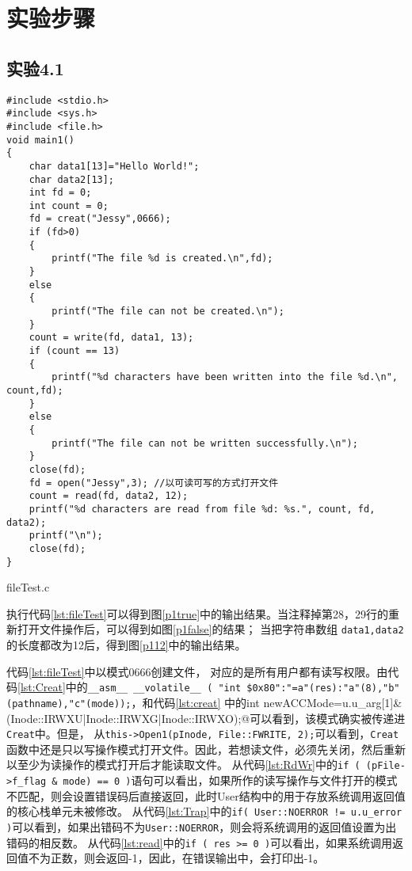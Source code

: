 \section{实验步骤}
\subsection{实验4.1}
\begin{listing}[htbp]
    \begin{verbatim}
#include <stdio.h>
#include <sys.h>
#include <file.h>
void main1()
{
    char data1[13]="Hello World!";
    char data2[13];
    int fd = 0;
    int count = 0;
    fd = creat("Jessy",0666);
    if (fd>0)
    {
        printf("The file %d is created.\n",fd);
    }
    else
    {
        printf("The file can not be created.\n");
    }
    count = write(fd, data1, 13);
    if (count == 13)
    {
        printf("%d characters have been written into the file %d.\n", count,fd);
    }
    else
    {
        printf("The file can not be written successfully.\n");
    }
    close(fd);
    fd = open("Jessy",3); //以可读可写的方式打开文件
    count = read(fd, data2, 12);
    printf("%d characters are read from file %d: %s.", count, fd, data2);
    printf("\n");
    close(fd);
}
    \end{verbatim}
    \caption{fileTest.c}\label{lst:fileTest}
\end{listing}

执行代码\ref{lst:fileTest}可以得到图\ref{p1true}中的输出结果。当注释掉第28，29行的重新打开文件操作后，可以得到如图\ref{p1false}的结果；
当把字符串数组 \texttt{data1,data2}的长度都改为12后，得到图\ref{p112}中的输出结果。

代码\ref{lst:fileTest}中以模式0666创建文件，
对应的是所有用户都有读写权限。由代码\ref{lst:Creat}中的\verb|__asm__ __volatile__ ( "int $0x80":"=a"(res):"a"(8),"b"(pathname),"c"(mode));|，和代码\ref{lst:creat}
中的\verb@unsigned int newACCMode=u.u_arg[1]&(Inode::IRWXU|Inode::IRWXG|Inode::IRWXO);@\newline 可以看到，该模式确实被传递进\texttt{Creat}中。但是，
从\verb|this->Open1(pInode, File::FWRITE, 2);|可以看到，\texttt{Creat}函数中还是只以写操作模式打开文件。因此，若想读文件，必须先关闭，然后重新以至少为读操作的模式打开后才能读取文件。
从代码\ref{lst:RdWr}中的\verb|if ( (pFile->f_flag & mode) == 0 )|语句可以看出，如果所作的读写操作与文件打开的模式不匹配，则会设置错误码后直接返回，此时User结构中的用于存放系统调用返回值的核心栈单元未被修改。
从代码\ref{lst:Trap}中的\verb|if( User::NOERROR != u.u_error )|可以看到，如果出错码不为\texttt{User::NOERROR}，则会将系统调用的返回值设置为出错码的相反数。
从代码\ref{lst:read}中的\verb|if ( res >= 0 )|可以看出，如果系统调用返回值不为正数，则会返回-1，因此，在错误输出中，会打印出-1。

